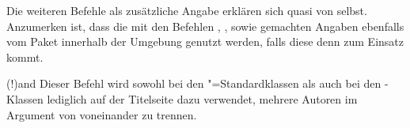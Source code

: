 \begin{DeclareEntity*}{}
\begin{DeclareEntity*}{}
\begin{DeclareEntity*}{}
\begin{Declaration}
\begin{Declaration}
\begin{Declaration}
\begin{Declaration}
\begin{Declaration}
\begin{Declaration}
\begin{Declaration}
\begin{Declaration}
\begin{Declaration}
\begin{Declaration}
Die weiteren Befehle als zusätzliche Angabe erklären sich quasi von selbst. 
Anzumerken ist, dass die mit den Befehlen , 
,  sowie  gemachten 
Angaben ebenfalls vom Paket  innerhalb der 
Umgebung  genutzt werden, falls diese denn zum Einsatz kommt.
\end{Declaration}
\end{Declaration}
\end{Declaration}
\end{Declaration}
\end{Declaration}
\end{Declaration}
\end{Declaration}
\end{Declaration}
\end{Declaration}
\end{Declaration}

\begin{Declaration}
  {\Macro(!){and}}
Dieser Befehl wird sowohl bei den "=Standardklassen als auch bei 
den \KOMAScript-Klassen lediglich auf der Titelseite dazu verwendet, mehrere 
Autoren im Argument von  voneinander zu trennen.


\end{Declaration}
\end{DeclareEntity*}
\end{DeclareEntity*}
\end{DeclareEntity*}
